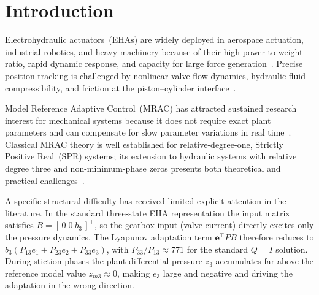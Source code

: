 \documentclass[12pt,a4paper]{article}
\theoremstyle{plain}
\theoremstyle{definition}
\theoremstyle{remark}
\newcommand{\e}{\mathbf{e}}     %
\begin{document}
\tableofcontents
\newpage

\section{Introduction}
\label{sec:intro}

Electrohydraulic actuators~(EHAs) are widely deployed in aerospace
actuation, industrial robotics, and heavy machinery because of their
high power-to-weight ratio, rapid dynamic response, and capacity for
large force generation~\cite{merritt1967,jelali2003}.  Precise
position tracking is challenged by nonlinear valve flow dynamics,
hydraulic fluid compressibility, and friction at the
piston--cylinder interface~\cite{manring2019}.

Model Reference Adaptive Control~(MRAC) has attracted sustained
research interest for mechanical systems because it does not require
exact plant parameters and can compensate for slow parameter
variations in real time~\cite{astrom2008,slotine1991}.  Classical
MRAC theory is well established for relative-degree-one, Strictly
Positive Real~(SPR) systems; its extension to hydraulic systems with
relative degree three and non-minimum-phase zeros presents both
theoretical and practical challenges~\cite{kocagil2022,yao2014}.

A specific structural difficulty has received limited explicit
attention in the literature.  In the standard three-state EHA
representation the input matrix satisfies
$B=[\,0\;0\;b_3\,]^\top$, so the gearbox input (valve current)
directly excites only the pressure dynamics.  The Lyapunov adaptation
term $\e^\top P B$ therefore reduces to
$b_3(P_{13}e_1+P_{23}e_2+P_{33}e_3)$, with $P_{33}/P_{13}\approx 771$
for the standard $Q=I$ solution.  During stiction phases the plant
differential pressure $z_3$ accumulates far above the reference model
value $z_{m3}\approx 0$, making $e_3$ large and negative and driving
the adaptation in the wrong direction.
\end{document}
